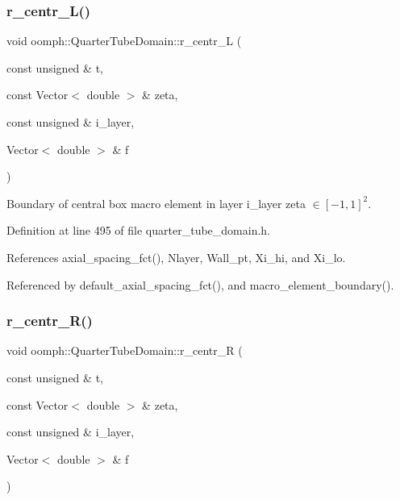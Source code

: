 \subsubsection{\texorpdfstring{r\+\_\+centr\+\_\+\+L()}{r\_centr\_L()}}
{\footnotesize\ttfamily void oomph\+::\+Quarter\+Tube\+Domain\+::r\+\_\+centr\+\_\+L (\begin{DoxyParamCaption}\item[{const unsigned \&}]{t,  }\item[{const Vector$<$ double $>$ \&}]{zeta,  }\item[{const unsigned \&}]{i\+\_\+layer,  }\item[{Vector$<$ double $>$ \&}]{f }\end{DoxyParamCaption})\hspace{0.3cm}{\ttfamily [private]}}



Boundary of central box macro element in layer i\+\_\+layer zeta $ \in [-1,1]^2 $. 



Definition at line 495 of file quarter\+\_\+tube\+\_\+domain.\+h.



References axial\+\_\+spacing\+\_\+fct(), Nlayer, Wall\+\_\+pt, Xi\+\_\+hi, and Xi\+\_\+lo.



Referenced by default\+\_\+axial\+\_\+spacing\+\_\+fct(), and macro\+\_\+element\+\_\+boundary().

\mbox{\label{classoomph_1_1QuarterTubeDomain_ae7312c0c8754d36a69e475cbf97e479e}} 
\subsubsection{\texorpdfstring{r\+\_\+centr\+\_\+\+R()}{r\_centr\_R()}}
{\footnotesize\ttfamily void oomph\+::\+Quarter\+Tube\+Domain\+::r\+\_\+centr\+\_\+R (\begin{DoxyParamCaption}\item[{const unsigned \&}]{t,  }\item[{const Vector$<$ double $>$ \&}]{zeta,  }\item[{const unsigned \&}]{i\+\_\+layer,  }\item[{Vector$<$ double $>$ \&}]{f }\end{DoxyParamCaption})\hspace{0.3cm}{\ttfamily [private]}}



